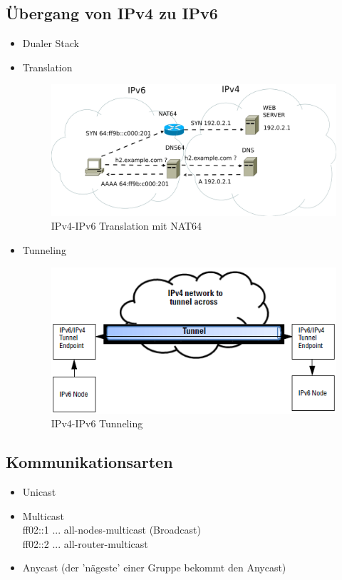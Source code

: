 \subsection*{Übergang von IPv4 zu IPv6}
\begin{itemize}
	\item Dualer Stack
	\item Translation
	\begin{figure}[H]
		\centering
		\includegraphics[width=0.7\linewidth]{figures/nat64.png}
		\caption{IPv4-IPv6 Translation mit NAT64}
	\end{figure}
	\item Tunneling
		\begin{figure}[H]
		\centering
		\includegraphics[width=0.7\linewidth]{figures/ipv6_tunneling.png}
		\caption{IPv4-IPv6 Tunneling}
	\end{figure}
\end{itemize}

\subsection*{Kommunikationsarten}
\begin{itemize}
	\item Unicast
	\item Multicast \\
	ff02::1 ... all-nodes-multicast (Broadcast) \\
	ff02::2 ... all-router-multicast
	\item Anycast (der 'nägeste' einer Gruppe bekommt den Anycast)
\end{itemize}

